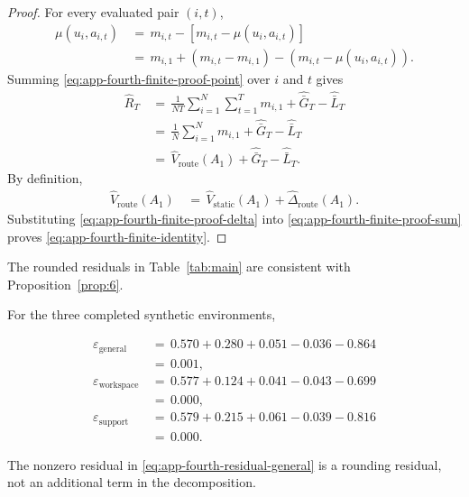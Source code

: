 \documentclass{article} %
\begin{document}
\begin{proof}
For every evaluated pair \((i,t)\),
\begin{align}
\label{eq:app-fourth-finite-proof-point}
\mu(u_i,a_{i,t})
&\,=\,
m_{i,t}
-
\left[
m_{i,t}-\mu(u_i,a_{i,t})
\right]
\\
&\,=\,
m_{i,1}
+
(m_{i,t}-m_{i,1})
-
(m_{i,t}-\mu(u_i,a_{i,t})).
\end{align}
Summing \eqref{eq:app-fourth-finite-proof-point} over \(i\) and \(t\) gives
\begin{align}
\label{eq:app-fourth-finite-proof-sum}
\widehat R_T
&\,=\,
\frac{1}{NT}
\sum_{i=1}^{N}
\sum_{t=1}^{T}
m_{i,1}
+
\widehat{\bar G}_T
-
\widehat{\bar L}_T
\\
&\,=\,
\frac{1}{N}
\sum_{i=1}^{N}
m_{i,1}
+
\widehat{\bar G}_T
-
\widehat{\bar L}_T
\\
&\,=\,
\widehat V_{\mathrm{route}}(A_1)
+
\widehat{\bar G}_T
-
\widehat{\bar L}_T.
\end{align}
By definition,
\begin{align}
\label{eq:app-fourth-finite-proof-delta}
\widehat V_{\mathrm{route}}(A_1)
&\,=\,
\widehat V_{\mathrm{static}}(A_1)
+
\widehat\Delta_{\mathrm{route}}(A_1).
\end{align}
Substituting \eqref{eq:app-fourth-finite-proof-delta} into \eqref{eq:app-fourth-finite-proof-sum} proves \eqref{eq:app-fourth-finite-identity}.
\end{proof}

The rounded residuals in Table~\ref{tab:main} are consistent with Proposition~\ref{prop:6}.

For the three completed synthetic environments,

\begin{align}
\label{eq:app-fourth-residual-general}
\varepsilon_{\mathrm{general}}
&\,=\,
0.570+0.280+0.051-0.036-0.864
\\
&\,=\,
0.001,
\\[0.5em]
\label{eq:app-fourth-residual-workspace}
\varepsilon_{\mathrm{workspace}}
&\,=\,
0.577+0.124+0.041-0.043-0.699
\\
&\,=\,
0.000,
\\[0.5em]
\label{eq:app-fourth-residual-support}
\varepsilon_{\mathrm{support}}
&\,=\,
0.579+0.215+0.061-0.039-0.816
\\
&\,=\,
0.000.
\end{align}

The nonzero residual in \eqref{eq:app-fourth-residual-general} is a rounding residual, not an additional term in the decomposition.
\end{document}
